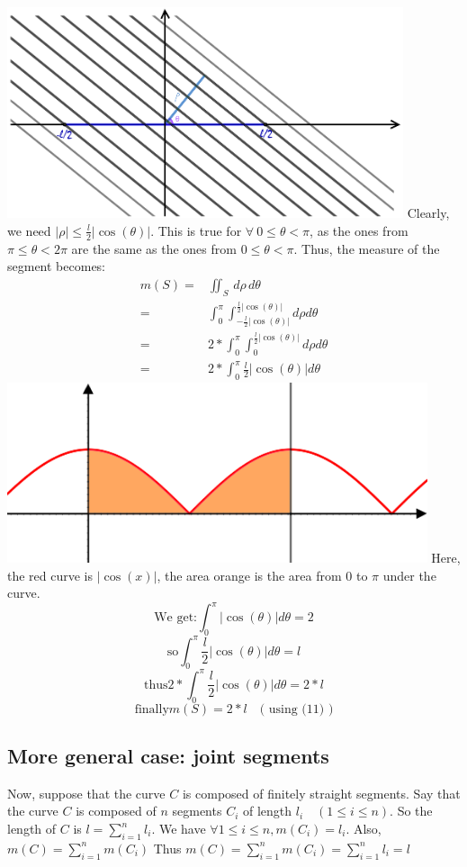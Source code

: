 \documentclass[a4paper]{article}
\begin{document}
\includegraphics[width=330pt]{img/figureSegment.png}
Clearly, we need $|\rho| \leq \frac{l}{2} |\cos (\theta)|$.
This is true for $\forall \ 0 \leq \theta < \pi$, as the ones from $\pi \leq \theta < 2\pi$ are the same as the ones from $0 \leq \theta < \pi$. Thus, the measure of the segment becomes:
\begin{align}
m(S) =& \iint_S \,d\rho\,d\theta \\
=& \int_{0}^{\pi} \int_{-\frac{l}{2} |\cos (\theta)|}^{\frac{l}{2} |\cos (\theta)|}  d\rho d\theta \\
=& 2 * \int_{0}^{\pi} \int_{0}^{\frac{l}{2} |\cos (\theta)|}  d\rho d\theta \\
=& 2 * \int_{0}^{\pi} \frac{l}{2} |\cos (\theta)| d\theta
\end{align}
\includegraphics[width=350pt]{img/figureCosIntegral.png}
Here, the red curve is $|\cos(x)|$, the area orange is the area from $0$ to $\pi$ under the curve.
$$ \text{We get:} \int_{0}^{\pi}|\cos (\theta)| d\theta = 2 $$
$$ \text{so}  \int_{0}^{\pi} \frac{l}{2} |\cos (\theta)| d\theta = l$$
$$ \text{thus}  2 * \int_{0}^{\pi} \frac{l}{2} |\cos (\theta)| d\theta = 2* l$$
$$ \text{finally}  m(S) = 2* l \quad \text{( using (11) )}$$

\subsection{More general case: joint segments}
Now, suppose that the curve $C$ is composed of finitely straight segments.
Say that the curve $C$ is composed of $n$ segments $C_i$ of length $l_i \quad (1 \leq i \leq n)$.
So the length of $C$ is $l=\sum_{i=1}^n l_i$.
We have $\forall 1 \leq i \leq n, m(C_i)=l_i$.
Also, $m(C) = \sum_{i=1}^n  m(C_i)$
Thus $m(C) = \sum_{i=1}^n  m(C_i) = \sum_{i=1}^n  l_i = l$
\end{document}
